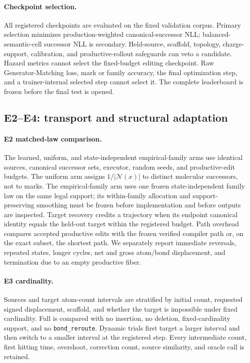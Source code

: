 \paragraph{Checkpoint selection.}
All registered checkpoints are evaluated on the fixed validation corpus.
Primary selection minimizes production-weighted canonical-successor NLL;
balanced-semantic-cell successor NLL is secondary. Held-source, scaffold, topology,
charge-support, calibration, and productive-rollout safeguards can veto a
candidate.  Hazard metrics cannot select the fixed-budget editing checkpoint.
Raw Generator-Matching loss, mark or family accuracy, the final optimization
step, and a trainer-internal selected step cannot select it. The complete
leaderboard is frozen before the final test is opened.

\subsection{E2--E4: transport and structural adaptation}
\label{app:e2-e4-protocols}

\paragraph{E2 matched-law comparison.}
The learned, uniform, and state-independent empirical-family arms use
identical sources, canonical successor sets, executor, random seeds, and
productive-edit budgets. The uniform arm assigns $1/|\mathcal N(x)|$ to
distinct molecular successors, not to marks. The empirical-family arm uses
one frozen state-independent family law on the same legal support; its
within-family allocation and support-preserving smoothing must be frozen
before implementation and before outputs are inspected. Target recovery
credits a trajectory when its endpoint canonical identity equals the held-out
target within the registered budget. Path overhead compares accepted
productive edits with the frozen verified compiler path or, on the exact
subset, the shortest path. We separately report immediate reversals, repeated
states, longer cycles, net and gross atom/bond displacement, and termination
due to an empty productive fiber.

\paragraph{E3 cardinality.}
Sources and target atom-count intervals are stratified by initial count,
requested signed displacement, scaffold, and whether the target is impossible
under fixed cardinality.  Full \method is compared with no insertion, no
deletion, fixed-cardinality support, and no \texttt{bond\_reroute}. Dynamic
trials first target a larger interval and then switch to a smaller interval at
the registered step. Every intermediate count, first hitting time, overshoot,
correction count, source similarity, and oracle call is retained.

